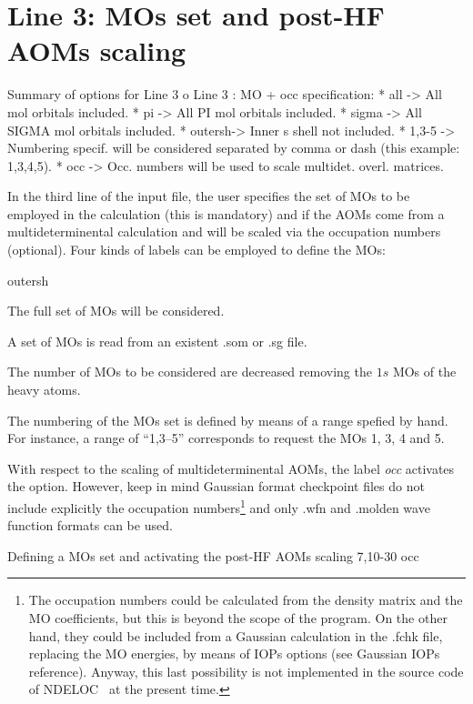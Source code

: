 \documentclass[a4paper,11pt,openany]{memoir}
\newcommand\programa{\textsc{NDELOC}}
\begin{document}
\section[Line 3: \acsp{MO} set and post-HF \acsp{AOM} scaling]{Line 3: \acp{MO} set and post-HF \acp{AOM} scaling}\label{sec:line3}
\begin{recuadro}{Summary of options for Line 3}
o Line 3 :  MO + occ        specification:
 *  all    -> All mol orbitals included.
 *  pi     -> All PI    mol orbitals included.
 *  sigma  -> All SIGMA mol orbitals included.
 *  outersh-> Inner s shell not included.
 *  1,3-5  -> Numbering specif. will be considered separated by comma or dash
              (this example: 1,3,4,5).
 *  occ    -> Occ. numbers will be used to scale multidet. overl. matrices.
\end{recuadro}
In the third line of the input file, the user specifies the set of \acp{MO} to be employed in the calculation (this is mandatory) and if the \acp{AOM} come from a multideterminental calculation and will be scaled via the occupation numbers (optional). Four kinds of labels can be employed to define the \acp{MO}:
\begin{labeling}{outersh}
	\item[all] The full set of \acp{MO} will be considered.
	\item[pi] A set of \acp{MO} is read from an existent .som or .sg file.
	\item[outersh] The number of \acp{MO} to be considered are decreased removing the $1s$ \acp{MO} of the heavy atoms.
	\item[\emph{range}] The numbering of the \acp{MO} set is defined by means of a range spefied by hand. For instance, a range of ``1,3--5'' corresponds to request the \acp{MO} 1, 3, 4 and 5.
\end{labeling}

With respect to the scaling of multideterminental \acp{AOM}, the label \emph{occ} activates the option. However, keep in mind Gaussian format checkpoint files do not include explicitly the occupation numbers\footnote{The occupation numbers could be calculated from the density matrix and the \ac{MO} coefficients, but this is beyond the scope of the program. On the other hand, they could be included from a Gaussian calculation in the .fchk file, replacing the \ac{MO} energies, by means of IOPs options (see Gaussian IOPs reference). Anyway, this last possibility is not implemented in the source code of \programa~ at the present time.} and only .wfn and .molden wave function formats can be used.
\begin{myexample}{Defining a \acp{MO} set and activating the post-HF \acp{AOM} scaling}
	7,10-30 occ
\end{myexample}
\end{document}
